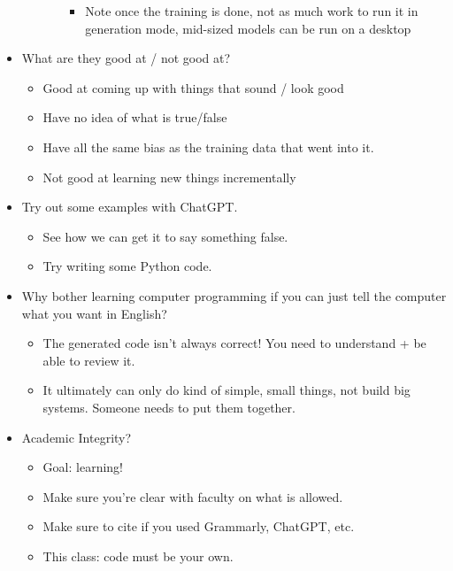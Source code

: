\documentclass{article}
\begin{document}
\begin{itemize}
\begin{itemize}
\begin{itemize}
      \begin{itemize}

      \item
        Note once the training is done, not as much work to run it in
        generation mode, mid-sized models can be run on a desktop
      \end{itemize}
    \end{itemize}
  \end{itemize}
\item
  What are they good at / not good at?

  \begin{itemize}

  \item
    Good at coming up with things that sound / look good
  \item
    Have no idea of what is true/false
  \item
    Have all the same bias as the training data that went into it.
  \item
    Not good at learning new things incrementally
  \end{itemize}
\item
  Try out some examples with ChatGPT.

  \begin{itemize}

  \item
    See how we can get it to say something false.
  \item
    Try writing some Python code.
  \end{itemize}
\item
  Why bother learning computer programming if you can just tell the
  computer what you want in English?

  \begin{itemize}

  \item
    The generated code isn't always correct! You need to understand + be
    able to review it.
  \item
    It ultimately can only do kind of simple, small things, not build
    big systems. Someone needs to put them together.
  \end{itemize}
\item
  Academic Integrity?

  \begin{itemize}

  \item
    Goal: learning!
  \item
    Make sure you're clear with faculty on what is allowed.
  \item
    Make sure to cite if you used Grammarly, ChatGPT, etc.
  \item
    This class: code must be your own.


\end{itemize}
\end{itemize}
\end{document}
